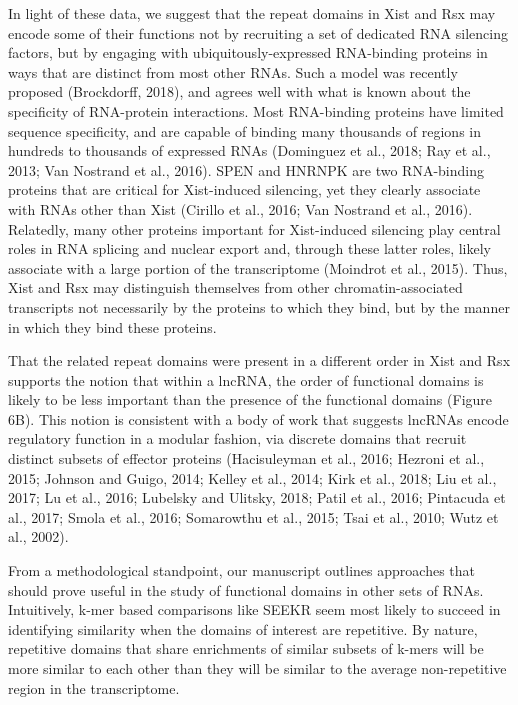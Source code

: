 In light of these data, we suggest that the repeat domains in Xist and Rsx may encode some of their functions not by recruiting a set of dedicated RNA silencing factors, but by engaging with ubiquitously-expressed RNA-binding proteins in ways that are distinct from most other RNAs. Such a model was recently proposed (Brockdorff, 2018), and agrees well with what is known about the specificity of RNA-protein interactions. Most RNA-binding proteins have limited sequence specificity, and are capable of binding many thousands of regions in hundreds to thousands of expressed RNAs (Dominguez et al., 2018; Ray et al., 2013; Van Nostrand et al., 2016). SPEN and HNRNPK are two RNA-binding proteins that are critical for Xist-induced silencing, yet they clearly associate with RNAs other than Xist (Cirillo et al., 2016; Van Nostrand et al., 2016). Relatedly, many other proteins important for Xist-induced silencing play central roles in RNA splicing and nuclear export and, through these latter roles, likely associate with a large portion of the transcriptome (Moindrot et al., 2015). Thus, Xist and Rsx may distinguish themselves from other chromatin-associated transcripts not necessarily by the proteins to which they bind, but by the manner in which they bind these proteins.

That the related repeat domains were present in a different order in Xist and Rsx supports the notion that within a lncRNA, the order of functional domains is likely to be less important than the presence of the functional domains (Figure 6B). This notion is consistent with a body of work that suggests lncRNAs encode regulatory function in a modular fashion, via discrete domains that recruit distinct subsets of effector proteins (Hacisuleyman et al., 2016; Hezroni et al., 2015; Johnson and Guigo, 2014; Kelley et al., 2014; Kirk et al., 2018; Liu et al., 2017; Lu et al., 2016; Lubelsky and Ulitsky, 2018; Patil et al., 2016; Pintacuda et al., 2017; Smola et al., 2016; Somarowthu et al., 2015; Tsai et al., 2010; Wutz et al., 2002). 

From a methodological standpoint, our manuscript outlines approaches that should prove useful in the study of functional domains in other sets of RNAs. Intuitively, k-mer based comparisons like SEEKR seem most likely to succeed in identifying similarity when the domains of interest are repetitive. By nature, repetitive domains that share enrichments of similar subsets of k-mers will be more similar to each other than they will be similar to the average non-repetitive region in the transcriptome. 

